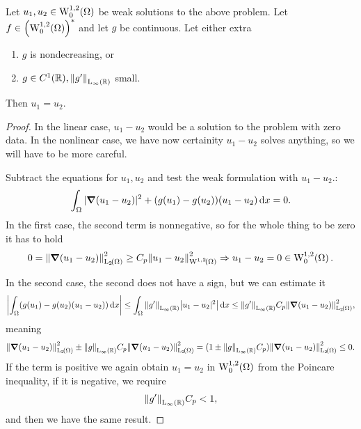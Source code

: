 \documentclass{article}
\begin{document}
\begin{example}
\begin{theorem}[Uniqueness]
	Let $u_1, u_2 \in \WkpzeroSet[1][2]{\Omega}$ be weak solutions to the above problem. Let $f \in \qty(\WkpzeroSet[1][2]{\Omega})^{*}$ and let $g$ be continuous. Let either extra 
	\begin{enumerate}
		\item $g$ is nondecreasing, or
		\item $g \in C^1\qty({\mathbb R}), \norm{g'}_{\text{L}_{\infty}\!\,\left({\mathbb R} \right)}$ small.
	\end{enumerate}
	Then $u_1 = u_2$.
\end{theorem}
\begin{proof}
	In the linear case, $u_1 - u_2$ would be a solution to the problem with zero data. In the nonlinear case, we have now certainity $u_1 - u_2$ solves anything, so we will have to be more careful.
	
Subtract the equations for $u_1, u_2$ and test the weak formulation with $u_1 - u_2.$:
	\[
		\int_{\Omega}|\grad(u_1 - u_2)|^{2} + (g(u_1)-g(u_2))\qty(u_1-u_2)\dd{x} = 0.
	\]
	In the first case, the second term is nonnegative, so for the whole thing to be zero it has to hold 
	\[
		0=\norm{\grad(u_1 - u_2)}_{\LpSet[2]{\Omega}}^{2} \geq C_p \norm{u_1 - u_2}_{\WkpSet[1][2]{\Omega}}^{2} \Rightarrow u_1 - u_2 = 0 \in \WkpzeroSet[1][2]{\Omega}.
	\]

	In the second case, the second does not have a sign, but we can estimate it
	\[
		\abs{\int_{\Omega}(g(u_1)-g(u_2)(u_1-u_2))\dd{x}} \leq \int_{\Omega}\norm{g'}_{\LinfSet{\R}}\abs{u_1 - u_2|^{2}}\dd{x} \leq \norm{g'}_{\LinfSet{\R}} C_p \norm{\grad(u_1 - u_2)}_{\LpSet[2]{\Omega}}^{2}, 
	\]
	meaning
	\[
		\norm{\grad\qty(u_1 - u_2)}_{\LpSet[2]{\Omega}}^{2} \pm \norm{g}_{\LinfSet{\R}}C_p \norm{\grad\qty(u_1 - u_2)}_{\LpSet[2]{\Omega}}^{2}  = (1 \pm \norm{g}_{\LinfSet{\R}}C_p)\norm{\grad\qty(u_1 - u_2)}_{\LpSet[2]{\Omega}}^{2} \leq 0.
	\]
	If the term is positive we again obtain $u_1 = u_2$ in $\WkpzeroSet[1][2]{\Omega}$ from the Poincare inequality, if it is negative, we require
	\[
		\norm{g'}_{\text{L}_{\infty}\!\,\left({\mathbb R} \right)}C_p < 1,
	\]
	and then we have the same result.
\end{proof}
\end{example}
\end{document}
